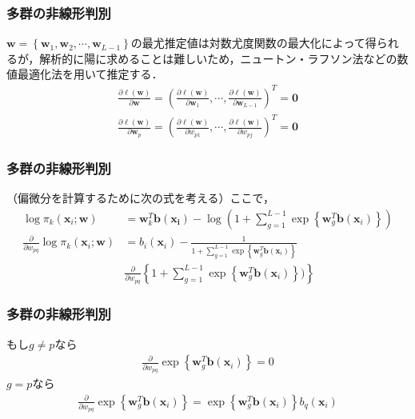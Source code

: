 \documentclass[dvipdfmx,cjk]{beamer}
\theoremstyle{example}
\begin{document}
\begin{frame}
    \frametitle{多群の非線形判別}
    $\boldsymbol{w}=\left\{\boldsymbol{w}_1,\boldsymbol{w}_2,\cdots ,\boldsymbol{w}_{L-1}\right\}$の最尤推定値は対数尤度関数の最大化によって得られるが，解析的に陽に求めることは難しいため，ニュートン・ラフソン法などの数値最適化法を用いて推定する．
    \begin{align*}
        \frac{\partial \ell(\boldsymbol{w})}{\partial \boldsymbol{w}}=(\frac{\partial \ell(\boldsymbol{w})}{\partial \boldsymbol{w}_1},\cdots , \frac{\partial \ell(\boldsymbol{w})}{\partial \boldsymbol{w}_{L-1}})^T=\boldsymbol{0} \\
        \frac{\partial \ell(\boldsymbol{w})}{\partial \boldsymbol{w}_p}=(\frac{\partial \ell(\boldsymbol{w})}{\partial w_{p1}},\cdots ,\frac{\partial \ell(\boldsymbol{w})}{\partial w_{pj}})^T=\boldsymbol{0}
    \end{align*}
\end{frame}

\begin{frame}
    \frametitle{多群の非線形判別}
    （偏微分を計算するために次の式を考える）ここで，
    \begin{align*}
        \log \pi_k(\boldsymbol{x}_i;\boldsymbol{w})                                  & =\boldsymbol{w}_k^T\boldsymbol{b}(\boldsymbol{x_i})-\log(1+\sum\limits_{g=1}^{L-1}\exp\left\{\boldsymbol{w}_g^T\boldsymbol{b}(\boldsymbol{x}_i)\right\}) \\
        \frac{\partial}{\partial w_{pq}} \log \pi_k(\boldsymbol{x}_i;\boldsymbol{w}) & =b_i(\boldsymbol{x}_i)-\frac{1}{1+\sum\limits_{g=1}^{L-1}\exp\left\{\boldsymbol{w}_g^T\boldsymbol{b}(\boldsymbol{x}_i)\right\}}                          \\
                                                                                     & \frac{\partial}{\partial w_{pq}}\left\{1+\sum\limits_{g=1}^{L-1}\exp\left\{\boldsymbol{w}_g^T\boldsymbol{b}(\boldsymbol{x}_i)\right\})\right\}\tag{B}
    \end{align*}
\end{frame}

\begin{frame}
    \frametitle{多群の非線形判別}
    もし$g\neq p$なら
    \begin{align*}
        \frac{\partial}{\partial w_{pq}}\exp\left\{\boldsymbol{w}_g^T\boldsymbol{b}(\boldsymbol{x}_i)\right\}=0
    \end{align*}
    $g=p$なら
    \begin{align*}
        \frac{\partial}{\partial w_{pq}}\exp\left\{\boldsymbol{w}_g^T\boldsymbol{b}(\boldsymbol{x}_i)\right\}=\exp \left\{\boldsymbol{w}_g^T\boldsymbol{b}(\boldsymbol{x}_i)\right\}b_q(\boldsymbol{x}_i)
    \end{align*}
\end{frame}
\end{document}
